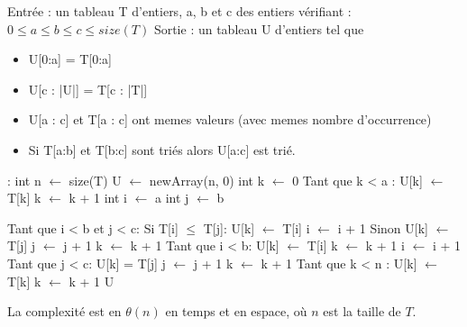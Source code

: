 \documentclass{article}
\begin{document}
\begin{algorithm}[H]
    \centering
    \caption{Solution Algorithmique de \textit{FUSION}}
    \begin{algorithmic}[1]
        \State Entrée : un tableau T d'entiers, a, b et c des entiers vérifiant : $ 0 \leq a \leq b \leq c \leq size(T) $
        \State Sortie : un tableau U d'entiers tel que 
        \begin{itemize}
            \item U[0:a] = T[0:a]
            \item U[c : |U|] = T[c : |T|]
            \item U[a : c] et T[a : c] ont memes valeurs (avec memes nombre d'occurrence) 
            \item Si T[a:b] et T[b:c] sont triés alors U[a:c] est trié.
        \end{itemize}
        :
            \State int n $\leftarrow$ size(T) 
            \State U $\leftarrow$ newArray(n, 0)
            \State int k $\leftarrow$ 0
            \State Tant que k < a : 
                \State \quad U[k] $\leftarrow$ T[k]
                \State  \quad k $\leftarrow$ k + 1
            \State int i $\leftarrow$ a 
            \State int j $\leftarrow$ b 

            \State Tant que i < b et j < c: 
                \State \quad Si T[i] $\leq$ T[j]:
                    \State \qquad U[k] $\leftarrow$ T[i]
                    \State \qquad i $\leftarrow$ i + 1
                \State \quad Sinon 
                    \State \qquad U[k] $\leftarrow$ T[j]
                    \State \qquad j $\leftarrow$ j + 1
                \State \quad k $\leftarrow$ k + 1
            \State Tant que i < b:
                \State \quad U[k] $ \leftarrow $ T[i]
                \State \quad k $ \leftarrow $ k + 1
                \State \quad i $ \leftarrow $ i + 1
            \State Tant que j < c: 
                \State \quad U[k] = T[j]
                \State \quad j $\leftarrow$ j + 1
                \State \quad k $\leftarrow$ k + 1
            \State Tant que k < n :
                \State \quad U[k] $\leftarrow$ T[k]
                \State \quad k $\leftarrow$ k + 1
            \State \Return U
        \EndFunction
    \end{algorithmic}
\end{algorithm}

La complexité est en $\theta(n)$ en temps et en espace, où $n$ est la taille de $T$.
\end{document}
